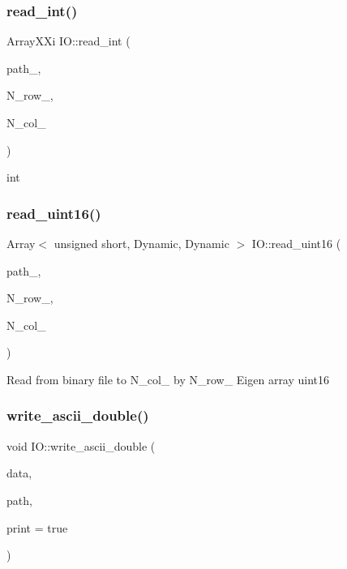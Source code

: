 \subsubsection{\texorpdfstring{read\+\_\+int()}{read\_int()}}
{\footnotesize\ttfamily Array\+X\+Xi I\+O\+::read\+\_\+int (\begin{DoxyParamCaption}\item[{const char $\ast$}]{path\+\_\+,  }\item[{int}]{N\+\_\+row\+\_\+,  }\item[{int}]{N\+\_\+col\+\_\+ }\end{DoxyParamCaption})}

int\mbox{\label{class_i_o_a0ba1550dc3c2b6fd4675bc03408b8d95}} 
\subsubsection{\texorpdfstring{read\+\_\+uint16()}{read\_uint16()}}
{\footnotesize\ttfamily Array$<$ unsigned short, Dynamic, Dynamic $>$ I\+O\+::read\+\_\+uint16 (\begin{DoxyParamCaption}\item[{const char $\ast$}]{path\+\_\+,  }\item[{int}]{N\+\_\+row\+\_\+,  }\item[{int}]{N\+\_\+col\+\_\+ }\end{DoxyParamCaption})}

Read from binary file to N\+\_\+col\+\_\+ by N\+\_\+row\+\_\+ Eigen array uint16\mbox{\label{class_i_o_a20602422f0a6615b265c96fc02523e6f}} 
\subsubsection{\texorpdfstring{write\+\_\+ascii\+\_\+double()}{write\_ascii\_double()}}
{\footnotesize\ttfamily void I\+O\+::write\+\_\+ascii\+\_\+double (\begin{DoxyParamCaption}\item[{Array\+Xd}]{data,  }\item[{std\+::string}]{path,  }\item[{bool}]{print = {\ttfamily true} }\end{DoxyParamCaption})}

